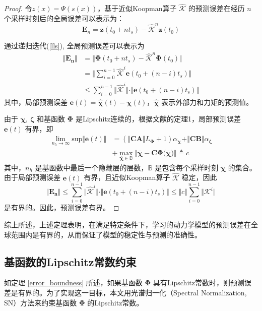 \documentclass[lang=chs, degree=master, blindreview=false, winfonts=true]{yanputhesis}
\begin{document}
\begin{proof}
	令$z(x)=\Psi(s(x))$，基于近似Koopman算子 $\hat{\bm{\mathcal{K}}}$ 的预测误差在经历 $n$ 个采样时刻后的全局误差可以表示为：
	\begin{equation}
		\bm{E}_n = \bm{z}(t_0 + nt_s) - \hat{\bm{\mathcal{K}}}^n \bm{z}(t_0)
	\end{equation}


	
	通过递归迭代(\ref{lls}), 全局预测误差可以表示为
	\[
	\begin{aligned}
		\Vert \bm{E_n} \Vert &= \Vert \bm{\Phi}(t_0+nt_s) -\hat{\bm{\mathcal{K}}}^n\bm{\Phi}(t_0) \Vert  \\
		&=\Vert \sum_{i=0}^{n-1}\hat{\bm{\mathcal{K}}}^i\bm{e}(t_0+(n-i)t_s)\Vert \\
		&\le \sum_{i=0}^{n-1}\Vert \hat{\bm{\mathcal{K}}}^i\Vert \cdot \Vert \bm{e}(t_0+(n-i)t_s) \Vert
	\end{aligned}
	\]
	其中，局部预测误差 $\bm{e}(t)=\bm{\hat{\chi}}(t)-\bm{\chi}(t)$，$\bm{\hat{\chi}}$ 表示外部力和力矩的预测值。
	
	由于 $\bm{\chi}$, $\bm{\zeta}$ 和基函数 $\bm{\Phi}$ 是Lipschitz连续的，根据文献\cite{Hao2024}的定理1，局部预测误差 $\bm{e}(t)$ 有界，即
	\[
	\begin{aligned}
		\lim_{n_h\rightarrow \infty} \text{sup} \Vert \bm{e}(t) \Vert &=(\Vert \bm{CA} \Vert L_{\bm{\Phi}}+1) \alpha_{\bm{\chi}}+\Vert \bm{CB}\Vert \alpha_{\bm{\zeta}} \\
		&+\max_{\overline{\bm{\chi}}\in \mathbb{B}} \Vert \overline{\bm{\chi}} -\bm{C}\bm{\Phi(\overline{\bm{\chi}}}) \Vert \triangleq c
	\end{aligned}
	\]
	其中，$n_h$ 是基函数中最后一个隐藏层的层数，$\mathbb{B}$ 是包含每个采样时刻 $\bm{\chi}$ 的集合。由于局部预测误差 $\bm{e}(t)$ 有界，且近似Koopman算子 $\hat{\bm{\mathcal{K}}}$ 稳定，因此
	\[
	\Vert \bm{E_n} \Vert \le \sum_{i=0}^{n-1}\Vert \hat{\bm{\mathcal{K}}}^i\Vert \cdot \Vert \bm{e}(t_0+(n-i)t_s) \Vert\le \Vert c \Vert \sum_{i=0}^{n-1}\Vert \bm{\mathcal{K}}^i \Vert
	\]
	是有界的。因此，预测误差有界。
\end{proof}

综上所述，上述定理表明，在满足特定条件下，学习的动力学模型的预测误差在全球范围内是有界的，从而保证了模型的稳定性与预测的准确性。

\subsection{基函数的Lipschitz常数约束}

如定理 \ref{error_boundness} 所述，如果基函数 $\bm{\Phi}$ 具有Lipschitz常数时，则预测误差是有界的。为了实现这一目标，本文用光谱归一化（Spectral Normalization, SN）方法来约束基函数 $\bm{\Phi}$ 的Lipschitz常数。
\end{document}

